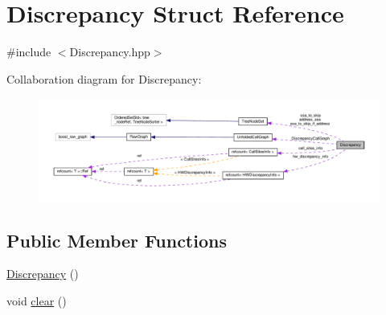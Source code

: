 \hypertarget{structDiscrepancy}{}\section{Discrepancy Struct Reference}
\label{structDiscrepancy}


{\ttfamily \#include $<$Discrepancy.\+hpp$>$}



Collaboration diagram for Discrepancy\+:
\nopagebreak
\begin{figure}[H]
\begin{center}
\leavevmode
\includegraphics[width=350pt]{d6/d28/structDiscrepancy__coll__graph}
\end{center}
\end{figure}
\subsection*{Public Member Functions}
\begin{DoxyCompactItemize}
\item 
\hyperlink{structDiscrepancy_a2b4af9043dce1074c182a0c4f8661e53}{Discrepancy} ()
\item 
void \hyperlink{structDiscrepancy_aef5d866bbdca6c194b1513f5fdd22efc}{clear} ()
\end{DoxyCompactItemize}
